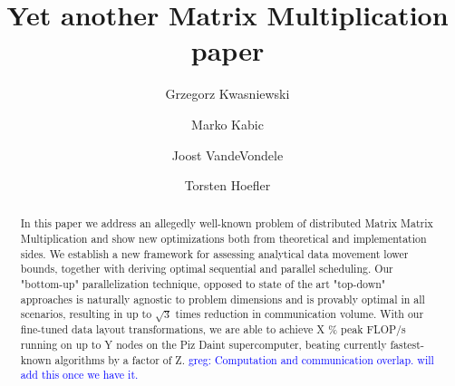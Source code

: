 \documentclass[sigconf]{acmart}
\newcommand\greg[1]{\textcolor{blue}{greg: #1}}
\begin{document}
	\title{Yet another Matrix Multiplication paper}
		
	\author{Grzegorz Kwasniewski}
	
			\author{Marko Kabic}
	
			\author{Joost VandeVondele}
	
		\author{Torsten Hoefler}
	
	\begin{abstract}
In this paper we address an allegedly well-known problem of distributed Matrix 
Matrix Multiplication and show new optimizations both from theoretical and 
implementation sides. We establish a new framework for 
assessing 
analytical data movement lower bounds, together with deriving optimal 
sequential and parallel scheduling. Our "bottom-up" parallelization technique, 
opposed to state of the art "top-down" approaches is naturally agnostic to 
problem dimensions and is provably optimal in all scenarios, resulting in up to 
$\sqrt{3}$ times reduction in communication volume. With our 
fine-tuned data layout 
transformations, we are able to achieve X \% peak FLOP/s running on up to Y 
nodes on the Piz Daint supercomputer, beating currently fastest-known 
algorithms by a factor of Z. \greg{Computation and communication overlap. will 
add this once we have it.}
	\end{abstract}



\maketitle
\end{document}

